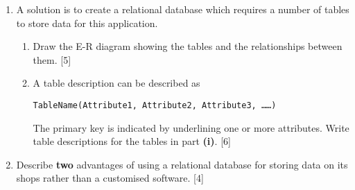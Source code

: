 \begin{enumerate}
\item A solution is to create a relational database which requires a number
of tables to store data for this application. 
\begin{enumerate}
\item Draw the E-R diagram showing the tables and the relationships between
them. \hfill{} {[}5{]}
\item A table description can be described as 

\texttt{TableName(Attribute1, Attribute2, Attribute3, \dots \dots ) }

The primary key is indicated by underlining one or more attributes.
Write table descriptions for the tables in part \textbf{(i)}. \hfill{}
{[}6{]}
\end{enumerate}
\item Describe \textbf{two} advantages of using a relational database for
storing data on its shops rather than a customised software. \hfill{}
{[}4{]}
\end{enumerate}